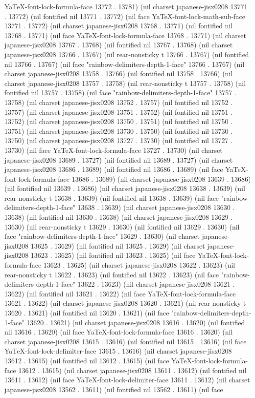 YaTeX-font-lock-formula-face 13772 . 13781) (nil charset japanese-jisx0208 13771 . 13772) (nil fontified nil 13771 . 13772) (nil face YaTeX-font-lock-math-sub-face 13771 . 13772) (nil charset japanese-jisx0208 13768 . 13771) (nil fontified nil 13768 . 13771) (nil face YaTeX-font-lock-formula-face 13768 . 13771) (nil charset japanese-jisx0208 13767 . 13768) (nil fontified nil 13767 . 13768) (nil charset japanese-jisx0208 13766 . 13767) (nil rear-nonsticky t 13766 . 13767) (nil fontified nil 13766 . 13767) (nil face "rainbow-delimiters-depth-1-face" 13766 . 13767) (nil charset japanese-jisx0208 13758 . 13766) (nil fontified nil 13758 . 13766) (nil charset japanese-jisx0208 13757 . 13758) (nil rear-nonsticky t 13757 . 13758) (nil fontified nil 13757 . 13758) (nil face "rainbow-delimiters-depth-1-face" 13757 . 13758) (nil charset japanese-jisx0208 13752 . 13757) (nil fontified nil 13752 . 13757) (nil charset japanese-jisx0208 13751 . 13752) (nil fontified nil 13751 . 13752) (nil charset japanese-jisx0208 13750 . 13751) (nil fontified nil 13750 . 13751) (nil charset japanese-jisx0208 13730 . 13750) (nil fontified nil 13730 . 13750) (nil charset japanese-jisx0208 13727 . 13730) (nil fontified nil 13727 . 13730) (nil face YaTeX-font-lock-formula-face 13727 . 13730) (nil charset japanese-jisx0208 13689 . 13727) (nil fontified nil 13689 . 13727) (nil charset japanese-jisx0208 13686 . 13689) (nil fontified nil 13686 . 13689) (nil face YaTeX-font-lock-formula-face 13686 . 13689) (nil charset japanese-jisx0208 13639 . 13686) (nil fontified nil 13639 . 13686) (nil charset japanese-jisx0208 13638 . 13639) (nil rear-nonsticky t 13638 . 13639) (nil fontified nil 13638 . 13639) (nil face "rainbow-delimiters-depth-1-face" 13638 . 13639) (nil charset japanese-jisx0208 13630 . 13638) (nil fontified nil 13630 . 13638) (nil charset japanese-jisx0208 13629 . 13630) (nil rear-nonsticky t 13629 . 13630) (nil fontified nil 13629 . 13630) (nil face "rainbow-delimiters-depth-1-face" 13629 . 13630) (nil charset japanese-jisx0208 13625 . 13629) (nil fontified nil 13625 . 13629) (nil charset japanese-jisx0208 13623 . 13625) (nil fontified nil 13623 . 13625) (nil face YaTeX-font-lock-formula-face 13623 . 13625) (nil charset japanese-jisx0208 13622 . 13623) (nil rear-nonsticky t 13622 . 13623) (nil fontified nil 13622 . 13623) (nil face "rainbow-delimiters-depth-1-face" 13622 . 13623) (nil charset japanese-jisx0208 13621 . 13622) (nil fontified nil 13621 . 13622) (nil face YaTeX-font-lock-formula-face 13621 . 13622) (nil charset japanese-jisx0208 13620 . 13621) (nil rear-nonsticky t 13620 . 13621) (nil fontified nil 13620 . 13621) (nil face "rainbow-delimiters-depth-1-face" 13620 . 13621) (nil charset japanese-jisx0208 13616 . 13620) (nil fontified nil 13616 . 13620) (nil face YaTeX-font-lock-formula-face 13616 . 13620) (nil charset japanese-jisx0208 13615 . 13616) (nil fontified nil 13615 . 13616) (nil face YaTeX-font-lock-delimiter-face 13615 . 13616) (nil charset japanese-jisx0208 13612 . 13615) (nil fontified nil 13612 . 13615) (nil face YaTeX-font-lock-formula-face 13612 . 13615) (nil charset japanese-jisx0208 13611 . 13612) (nil fontified nil 13611 . 13612) (nil face YaTeX-font-lock-delimiter-face 13611 . 13612) (nil charset japanese-jisx0208 13562 . 13611) (nil fontified nil 13562 . 13611) (nil face 